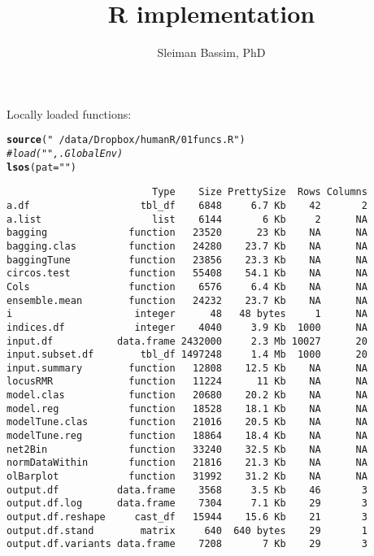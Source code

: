 \documentclass[9pt,english]{extarticle}\usepackage[]{graphicx}\usepackage[]{color}
\makeatletter
\newcommand{\hlstr}[1]{\textcolor[rgb]{0.192,0.494,0.8}{#1}}%
\newcommand{\hlcom}[1]{\textcolor[rgb]{0.678,0.584,0.686}{\textit{#1}}}%
\newcommand{\hlstd}[1]{\textcolor[rgb]{0.345,0.345,0.345}{#1}}%
\newcommand{\hlkwc}[1]{\textcolor[rgb]{0.333,0.667,0.333}{#1}}%
\newcommand{\hlkwd}[1]{\textcolor[rgb]{0.737,0.353,0.396}{\textbf{#1}}}%
\newenvironment{kframe}{%
 \def\at@end@of@kframe{}%
 \ifinner\ifhmode%
  \def\at@end@of@kframe{\end{minipage}}%
  \begin{minipage}{\columnwidth}%
 \fi\fi%
 \def\FrameCommand##1{\hskip\@totalleftmargin \hskip-\fboxsep
 \colorbox{shadecolor}{##1}\hskip-\fboxsep
     \hskip-\linewidth \hskip-\@totalleftmargin \hskip\columnwidth}%
 \MakeFramed {\advance\hsize-\width
   \@totalleftmargin\z@ \linewidth\hsize
   \@setminipage}}%
 {\par\unskip\endMakeFramed%
 \at@end@of@kframe}
\newenvironment{knitrout}{}{} %
\makeatother
\begin{document}
\author{Sleiman Bassim, PhD}
\title{R implementation}
\maketitle
\begin{linenumbers}



Locally loaded functions:
\begin{knitrout}
\color{fgcolor}\begin{kframe}
\begin{alltt}
\hlkwd{source}\hlstd{(}\hlstr{"~/data/Dropbox/humanR/01funcs.R"}\hlstd{)}
\hlcom{#load("", .GlobalEnv)}
\hlkwd{lsos}\hlstd{(}\hlkwc{pat}\hlstd{=}\hlstr{""}\hlstd{)}
\end{alltt}
\begin{verbatim}
                         Type    Size PrettySize  Rows Columns
a.df                   tbl_df    6848     6.7 Kb    42       2
a.list                   list    6144       6 Kb     2      NA
bagging              function   23520      23 Kb    NA      NA
bagging.clas         function   24280    23.7 Kb    NA      NA
baggingTune          function   23856    23.3 Kb    NA      NA
circos.test          function   55408    54.1 Kb    NA      NA
Cols                 function    6576     6.4 Kb    NA      NA
ensemble.mean        function   24232    23.7 Kb    NA      NA
i                     integer      48   48 bytes     1      NA
indices.df            integer    4040     3.9 Kb  1000      NA
input.df           data.frame 2432000     2.3 Mb 10027      20
input.subset.df        tbl_df 1497248     1.4 Mb  1000      20
input.summary        function   12808    12.5 Kb    NA      NA
locusRMR             function   11224      11 Kb    NA      NA
model.clas           function   20680    20.2 Kb    NA      NA
model.reg            function   18528    18.1 Kb    NA      NA
modelTune.clas       function   21016    20.5 Kb    NA      NA
modelTune.reg        function   18864    18.4 Kb    NA      NA
net2Bin              function   33240    32.5 Kb    NA      NA
normDataWithin       function   21816    21.3 Kb    NA      NA
olBarplot            function   31992    31.2 Kb    NA      NA
output.df          data.frame    3568     3.5 Kb    46       3
output.df.log      data.frame    7304     7.1 Kb    29       3
output.df.reshape     cast_df   15944    15.6 Kb    21       3
output.df.stand        matrix     640  640 bytes    29       1
output.df.variants data.frame    7208       7 Kb    29       3

\end{verbatim}
\end{kframe}
\end{knitrout}
\end{linenumbers}
\end{document}
